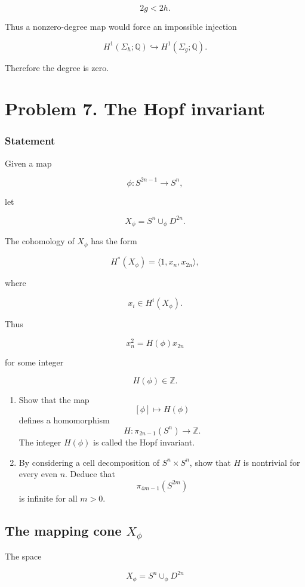 \documentclass[12pt,a4paper]{article}
\theoremstyle{notespace}
\begin{document}
\[
2g<2h.
\]

Thus a nonzero-degree map would force an impossible injection

\[
H^1(\Sigma_h;\mathbb Q)\hookrightarrow H^1(\Sigma_g;\mathbb Q).
\]

Therefore the degree is zero.

\section{Problem 7. The Hopf invariant}

\subsubsection*{Statement}

Given a map

\[
\phi:S^{2n-1}\longrightarrow S^n,
\]

let

\[
X_\phi=S^n\cup_\phi D^{2n}.
\]

The cohomology of \(X_\phi\) has the form

\[
H^*(X_\phi)=\langle 1,x_n,x_{2n}\rangle,
\]

where

\[
x_i\in H^i(X_\phi).
\]

Thus

\[
x_n^2=H(\phi)x_{2n}
\]

for some integer

\[
H(\phi)\in \mathbb Z.
\]

\begin{enumerate}
	\item[(a)] Show that the map
	\[
	[\phi]\longmapsto H(\phi)
	\]
	defines a homomorphism
	\[
	H:\pi_{2n-1}(S^n)\longrightarrow \mathbb Z.
	\]
	The integer \(H(\phi)\) is called the Hopf invariant.
	
	\item[(b)] By considering a cell decomposition of \(S^n\times S^n\), show that \(H\) is nontrivial for every even \(n\). Deduce that
	\[
	\pi_{4m-1}(S^{2m})
	\]
	is infinite for all \(m>0\).
\end{enumerate}

\subsection{The mapping cone \(X_\phi\)}

The space

\[
X_\phi=S^n\cup_\phi D^{2n}
\]
\end{document}
